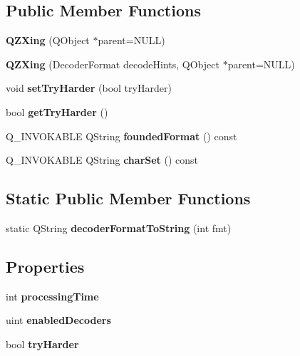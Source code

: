 \subsection*{Public Member Functions}
\begin{DoxyCompactItemize}
\item 
\mbox{\label{class_q_z_xing_a85b600f7187035028dd34a305e65b4f6}} 
{\bfseries Q\+Z\+Xing} (Q\+Object $\ast$parent=N\+U\+LL)
\item 
\mbox{\label{class_q_z_xing_a63b9910d33da75663100690a09754c9b}} 
{\bfseries Q\+Z\+Xing} (Decoder\+Format decode\+Hints, Q\+Object $\ast$parent=N\+U\+LL)
\item 
\mbox{\label{class_q_z_xing_ab14fbffee0f97aab0e7eb6d0f2156c1e}} 
void {\bfseries set\+Try\+Harder} (bool try\+Harder)
\item 
\mbox{\label{class_q_z_xing_a06343821c76155b266615a2ce28d48ea}} 
bool {\bfseries get\+Try\+Harder} ()
\item 
\mbox{\label{class_q_z_xing_a830477fc7f3bdbd92ee6283343bf9666}} 
Q\+\_\+\+I\+N\+V\+O\+K\+A\+B\+LE Q\+String {\bfseries founded\+Format} () const
\item 
\mbox{\label{class_q_z_xing_a051c4202f01e85db73f90e09343da041}} 
Q\+\_\+\+I\+N\+V\+O\+K\+A\+B\+LE Q\+String {\bfseries char\+Set} () const
\end{DoxyCompactItemize}
\subsection*{Static Public Member Functions}
\begin{DoxyCompactItemize}
\item 
\mbox{\label{class_q_z_xing_a735c7db98c0e7040fdbec71b12304881}} 
static Q\+String {\bfseries decoder\+Format\+To\+String} (int fmt)
\end{DoxyCompactItemize}
\subsection*{Properties}
\begin{DoxyCompactItemize}
\item 
\mbox{\label{class_q_z_xing_a039a55ba6f1e5e416a39b26c407ee777}} 
int {\bfseries processing\+Time}
\item 
\mbox{\label{class_q_z_xing_a68bf4e8976f78f9d58e6497ed91077fb}} 
uint {\bfseries enabled\+Decoders}
\item 
\mbox{\label{class_q_z_xing_a56c829ac5c8f3eaced1e14e56d56c324}} 
bool {\bfseries try\+Harder}
\end{DoxyCompactItemize}


